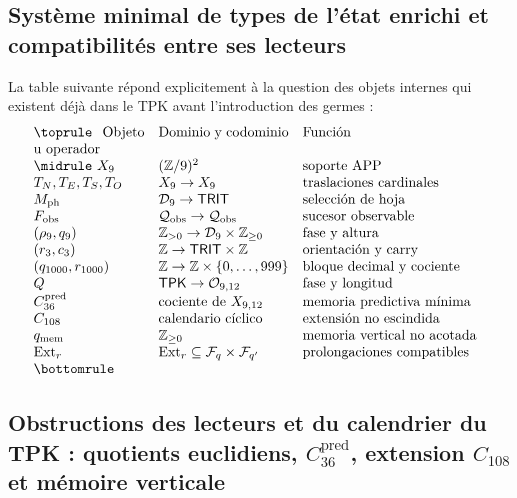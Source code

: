 \subsection{Système minimal de types de l’état enrichi et compatibilités entre ses lecteurs}

La table suivante répond explicitement à la question des objets internes qui
existent déjà dans le TPK avant l’introduction des germes :
\[
\begin{array}{p{.23\textwidth}p{.27\textwidth}p{.38\textwidth}}
\toprule
Objeto u operador&Dominio y codominio&Función\\\midrule
\(X_9\)&\((\mathbb Z/9)^2\)&soporte APP\\
\(T_N,T_E,T_S,T_O\)&\(X_9\to X_9\)&traslaciones cardinales\\
\(M_{\rm ph}\)&\(\mathcal D_9\to\mathsf{TRIT}\)&selección de hoja\\
\(F_{\rm obs}\)&\(\mathcal Q_{\rm obs}\to\mathcal Q_{\rm obs}\)&sucesor observable\\
\((\rho_9,q_9)\)&\(\mathbb Z_{>0}\to\mathcal D_9\times\mathbb Z_{\ge0}\)&fase y altura\\
\((r_3,c_3)\)&\(\mathbb Z\to\mathsf{TRIT}\times\mathbb Z\)&orientación y carry\\
\((q_{1000},r_{1000})\)&\(\mathbb Z\to\mathbb Z\times\{0,\ldots,999\}\)&bloque decimal y cociente\\
\(Q\)&\(\mathsf{TPK}\to\mathcal O_{9,12}\)&fase y longitud\\
\(C_{36}^{\rm pred}\)&cociente de \(X_{9,12}\)&memoria predictiva mínima\\
\(C_{108}\)&calendario cíclico&extensión no escindida\\
\(q_{\rm mem}\)&\(\mathbb Z_{\ge0}\)&memoria vertical no acotada\\
\(\operatorname{Ext}_r\)&
\(\operatorname{Ext}_r\subseteq\mathcal F_q\times\mathcal F_{q'}\)&
prolongaciones compatibles\\
\bottomrule
\end{array}
\]

\subsection{Obstructions des lecteurs et du calendrier du TPK : quotients euclidiens, \(C_{36}^{\mathrm{pred}}\), extension \(C_{108}\) et mémoire verticale}

